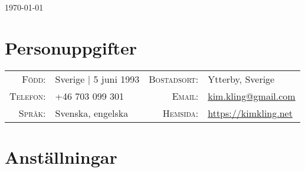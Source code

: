 \documentclass[a4paper,10pt]{scrartcl} %
\begin{document}
\pagestyle{empty} %


\hfill {\small \today}
\par{
	\bigskip\par
}

\section{Personuppgifter}

\begin{tabular}{rp{6cm}rl}
	\textsc{Född:}          & Sverige | 5 juni 1993 &
    \textsc{Bostadsort:}    & Ytterby, Sverige \\
	
	\textsc{Telefon:}       & +46 703 099 301 &
	\textsc{Email:}         & \href{mailto:kim.kling@gmail.com}{kim.kling@gmail.com} \\
	
	\textsc{Språk:}         & Svenska, engelska &
	\textsc{Hemsida:}       & \href{https://kimkling.net}{https://kimkling.net}
\end{tabular}



\section{Anställningar}
\end{document}
